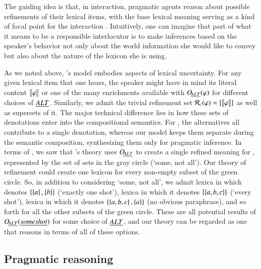 \documentclass[leqno,12pt]{article}
\begin{document}
The guiding idea is that, in interaction, pragmatic agents reason
about possible refinements of their lexical items, with the base
lexical meaning serving as a kind of focal point for the interaction
\citep{Franke09DISS}.  Intuitively, one can imagine that part of what
it means to be a responsible interlocutor is to make inferences based
on the speaker's behavior not only about the world information she
would like to convey but also about the nature of the lexicon she is
using.

As we noted above, \CFS's model embodies aspects of lexical
uncertainty. For any given lexical item that one hears, the speaker
might have in mind its literal content $\llbracket\varphi\rrbracket$ or one of the
many enrichments available with $\mathop{O\negthinspace_{\emph{ALT}}}(\varphi)$ for different choices
of $\emph{ALT}$. Similarly, we admit the trivial refinement set
$\mathcal{R}_{c}(\varphi) = \left\{ \llbracket\varphi\rrbracket \right\}$ as well as supersets of
it. The major technical difference lies in how these sets of
denotations enter into the compositional semantics. For \CFS, the
alternatives all contribute to a single denotation, whereas our model
keeps them separate during the semantic composition, synthesizing them
only for pragmatic inference. In terms of , we saw
that \CFS's theory uses $\mathop{O\negthinspace_{\emph{ALT}}}$ to create a single refined meaning for
, represented by the set of sets in the gray circle
(`some, not all'). Our theory of refinement could create one lexicon
for every non-empty subset of the green circle. So, in addition to
considering `some, not all', we admit lexica in which  denotes $\left\{ \left\{ a \right\}, \left\{ b \right\} \right\}$ (`exactly one shot'),
lexica in which it denotes $\left\{ \left\{ a,b,c \right\} \right\}$ (`every shot'), lexica
in which it denotes $\left\{ \left\{ a,b,c \right\},\left\{ a \right\} \right\}$ (no obvious
paraphrase), and so forth for all the other subsets of the green
circle. These are all potential results of $\mathop{O\negthinspace_{\emph{ALT}}}(\emph{some shot})$
for some choice of $\emph{ALT}$, and our theory can be regarded as one that
reasons in terms of all of these options.


\subsection{Pragmatic reasoning}\label{sec:agents}
\end{document}
